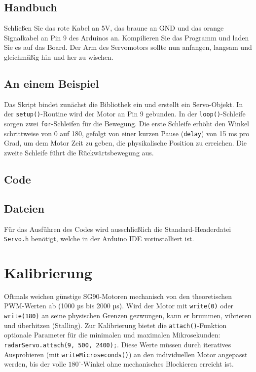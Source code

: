 \subsection{Handbuch}
Schließen Sie das rote Kabel an 5V, das braune an GND und das orange Signalkabel an Pin 9 des Arduinos an. Kompilieren Sie das Programm und laden Sie es auf das Board. Der Arm des Servomotors sollte nun anfangen, langsam und gleichmäßig hin und her zu wischen.

\subsection{An einem Beispiel}
Das Skript bindet zunächst die Bibliothek ein und erstellt ein Servo-Objekt. In der \texttt{setup()}-Routine wird der Motor an Pin 9 gebunden. In der \texttt{loop()}-Schleife sorgen zwei \texttt{for}-Schleifen für die Bewegung. Die erste Schleife erhöht den Winkel schrittweise von 0 auf 180, gefolgt von einer kurzen Pause (\texttt{delay}) von 15 ms pro Grad, um dem Motor Zeit zu geben, die physikalische Position zu erreichen. Die zweite Schleife führt die Rückwärtsbewegung aus.

\subsection{Code}
\begin{center}
	  \label{Nano:RGBLEDTest}  
\end{center}

\subsection{Dateien}
Für das Ausführen des Codes wird ausschließlich die Standard-Headerdatei \texttt{Servo.h} benötigt, welche in der Arduino IDE vorinstalliert ist.

\section{Kalibrierung}
Oftmals weichen günstige SG90-Motoren mechanisch von den theoretischen PWM-Werten ab (1000 µs bis 2000 µs). Wird der Motor mit \texttt{write(0)} oder \texttt{write(180)} an seine physischen Grenzen gezwungen, kann er brummen, vibrieren und überhitzen (Stalling). Zur Kalibrierung bietet die \texttt{attach()}-Funktion optionale Parameter für die minimalen und maximalen Mikrosekunden: \texttt{radarServo.attach(9, 500, 2400);}. Diese Werte müssen durch iteratives Ausprobieren (mit \texttt{writeMicroseconds()}) an den individuellen Motor angepasst werden, bis der volle $180^\circ$-Winkel ohne mechanisches Blockieren erreicht ist.


